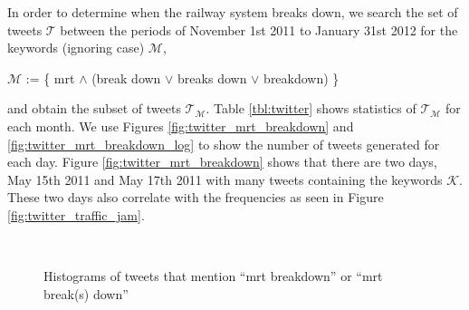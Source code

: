 \documentclass[conference]{IEEEtran.1.8}
\begin{document}
In order to determine when the railway system breaks down, we search the set of tweets $\mathcal{T}$ between the periods of November 1st 2011 to January 31st 2012 for the keywords (ignoring case) $\mathcal{M}$,
\begin{center}
	$\mathcal{M}$ := \{ mrt $\land$ (break down $\lor$ breaks down $\lor$ breakdown) \}
\end{center}
and obtain the subset of tweets $\mathcal{T}_\mathcal{M}$. Table \ref{tbl:twitter} shows statistics of $\mathcal{T}_\mathcal{M}$ for each month. We use Figures \ref{fig:twitter_mrt_breakdown} and \ref{fig:twitter_mrt_breakdown_log} to show the number of tweets generated for each day. Figure \ref{fig:twitter_mrt_breakdown} shows that there are two days, May 15th 2011 and May 17th 2011 with many tweets containing the keywords $\mathcal{K}$. These two days also correlate with the frequencies as seen in Figure \ref{fig:twitter_traffic_jam}.
\begin{figure}[htb]
	\centering
	\\
	\caption{Histograms of tweets that mention ``mrt breakdown'' or ``mrt break(s) down''}
	\label{fig:twitter_histograms}
\end{figure}
\end{document}
